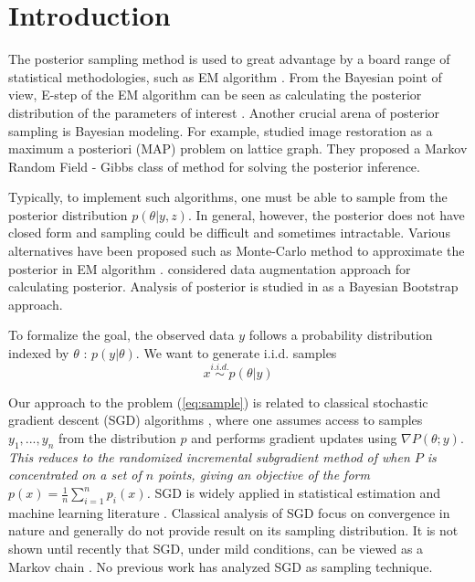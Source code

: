 \documentclass[preprint,12pt,3p]{elsarticle}
\begin{document}
\section{Introduction} %
\label{sec:introduction}

The posterior sampling method is used to great advantage by a board range of statistical methodologies, such as EM algorithm \citep{Dempster_Maximum_1977}. From the Bayesian point of view, E-step of the EM algorithm can be seen as calculating the posterior distribution of the parameters of interest \citep{Tanner_The_1987}. Another crucial arena of posterior sampling is Bayesian modeling. For example, \cite{Geman_Stochastic_1993} studied image restoration as a maximum a posteriori (MAP) problem on lattice graph. They proposed a Markov Random Field - Gibbs class of method for solving the posterior inference.

Typically, to implement such algorithms, one must be able to sample from the posterior distribution $p(\theta|y,z)$. In general, however, the posterior does not have closed form and sampling could be difficult and sometimes intractable. Various alternatives have been proposed such as Monte-Carlo method to approximate the posterior in EM algorithm \citep{Wei_A_1990}. \cite{Tanner_The_1987} considered data augmentation approach for calculating posterior. Analysis of posterior is studied in \cite{Rubin_The_1981} as a Bayesian Bootstrap approach.

To formalize the goal, the observed data $y$ follows a probability distribution indexed by $\theta$ : $p(y | \theta)$. We want to generate i.i.d. samples
\begin{equation}
\label{eq:sample}
x\mathop \sim\limits^{i.i.d.} p(\theta |y)
\end{equation}

Our approach to the problem (\ref{eq:sample}) is related to classical stochastic gradient descent (SGD) algorithms \citep{Robbins_A_1951,Polyak_Acceleration_1992}, where one assumes access to samples $y_1, ..., y_n$ from the distribution $p$ and performs gradient updates using $\nabla P(\theta ;y)$. \emph{This reduces to the randomized incremental subgradient method of \cite{Nedic_Incremental_2001} when $P$ is concentrated on a set of $n$ points, giving an objective of the form
$p(x) = \frac{1}{n}\sum\limits_{i = 1}^n {{p_i}(x)}$.} SGD is widely applied in statistical estimation and machine learning literature \citep{LeCun_Efficient_2012,Finkel_Efficient_2008}. Classical analysis of SGD focus on convergence in nature and generally do not provide result on its sampling distribution. It is not shown until recently that SGD, under mild conditions, can be viewed as a Markov chain \citep{kushner2012stochastic,bach2014adaptivity}. No previous work has analyzed SGD as sampling technique.
\end{document}
